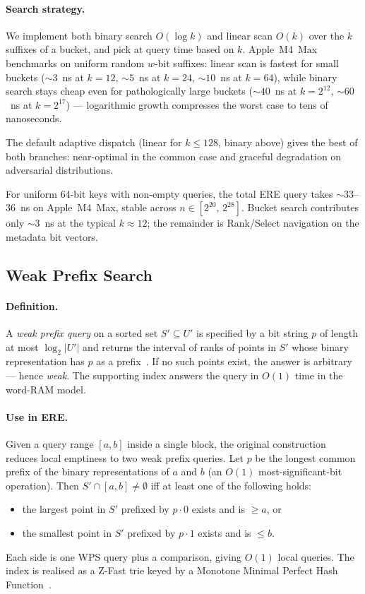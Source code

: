 \paragraph{Search strategy.}
We implement both binary search $O(\log k)$ and linear scan $O(k)$ over
the $k$ suffixes of a bucket, and pick at query time based on $k$.
Apple~M4~Max benchmarks on uniform random $w$-bit suffixes:
linear scan is fastest for small buckets (${\sim}3$~ns at $k = 12$,
${\sim}5$~ns at $k = 24$, ${\sim}10$~ns at $k = 64$), while binary search
stays cheap even for pathologically large buckets (${\sim}40$~ns at
$k = 2^{12}$, ${\sim}60$~ns at $k = 2^{17}$) --- logarithmic growth
compresses the worst case to tens of nanoseconds.

The default adaptive dispatch (linear for $k \leq 128$, binary above) gives
the best of both branches: near-optimal in the common case and graceful
degradation on adversarial distributions.

For uniform 64-bit keys with non-empty queries, the total ERE query takes
${\sim}33$--$36$~ns on Apple~M4~Max, stable across $n \in [2^{20},\, 2^{28}]$.
Bucket search contributes only ${\sim}3$~ns at the typical $k \approx 12$;
the remainder is Rank/Select navigation on the metadata bit vectors.

\subsection{Weak Prefix Search}
\label{sec:wps}

\paragraph{Definition.}
A \emph{weak prefix query} on a sorted set $S' \subseteq U'$ is
specified by a bit string $p$ of length at most $\log_2 |U'|$ and
returns the interval of ranks of points in $S'$ whose binary
representation has $p$ as a prefix~\citep[\S 3.2]{goswami2015approximate}.
If no such points exist, the answer is arbitrary --- hence
\emph{weak}. The supporting index answers the query in $O(1)$
time in the word-RAM model.

\paragraph{Use in ERE.}
Given a query range $[a, b]$ inside a single block, the original
construction~\citep[\S 3.2]{goswami2015approximate} reduces local
emptiness to two weak prefix queries. Let $p$ be the longest common
prefix of the binary representations of $a$ and $b$ (an $O(1)$
most-significant-bit operation). Then $S' \cap [a, b] \neq \emptyset$
iff at least one of the following holds:
\begin{itemize}
    \item the largest point in $S'$ prefixed by $p \cdot 0$ exists
    and is $\geq a$, or
    \item the smallest point in $S'$ prefixed by $p \cdot 1$ exists
    and is $\leq b$.
\end{itemize}
Each side is one WPS query plus a comparison, giving $O(1)$ local
queries. The index is realised as a Z-Fast trie keyed by a Monotone
Minimal Perfect Hash Function~\citep{belazzougui2009monotone}.

